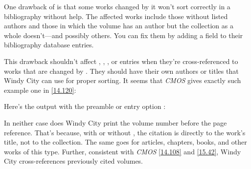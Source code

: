 \documentclass[11pt,letterpaper,oneside]{article}
\begin{document}
\begin{citebib}
\item \cite{barrows1959}
\end{citebib}

One drawback of  is that some works changed by it won't
sort correctly in a bibliography without help. The affected works
include those without listed authors and those in which the volume has
an author but the collection as a whole doesn't---and possibly others.
You can fix them by adding a  field to their
bibliography database entries.

This drawback shouldn't affect ,
, , or 
entries when they're cross-referenced to works that are changed by
. They should have their own authors or titles that Windy
City can use for proper sorting. It seems that \textit{CMOS} gives
exactly such example one in \ref{14.120}:

\begin{citebib}
\item \cite[169--71]{king2014}
\item \cite[170]{king2014}
\end{citebib}

\noindent Here's the output with the preamble or entry option
:

\begin{citebib}
\item \cite[169--71]{king2014}
\item \cite[170]{king2014}
\end{citebib}

In neither case does Windy City print the volume number before the
page reference. That's because, with or without , the
citation is directly to the work's title, not to the collection. The
same goes for articles, chapters, books, and other works of this type.
Further, consistent with \textit{CMOS} \ref{14.108} and \ref{15.42},
Windy City cross-references previously cited volumes.


\begin{citebib}
\item \cite[56]{doe2018}
\item \cite[128]{edwards2018}
\nocite{jones2018}
\end{citebib}
\end{document}
